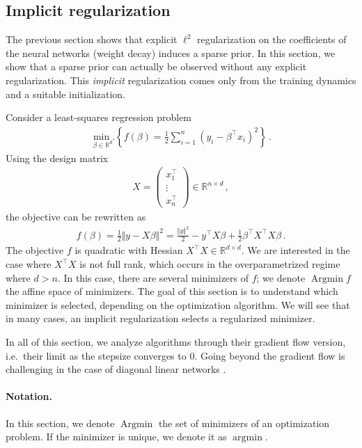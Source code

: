 \documentclass[11pt,reqno]{article}
\DeclareMathOperator*{\argmin}{argmin}
\DeclareMathOperator*{\Argmin}{Argmin}
\newcommand{\R}{\mathbb{R}}
\numberwithin{equation}{section}
\theoremstyle{plain}
\theoremstyle{definition}
\theoremstyle{remark}
\begin{document}
\subsection{Implicit regularization}

The previous section shows that explicit $\ell^2$ regularization on the coefficients of the neural networks (weight decay) induces a sparse prior. In this section, we show that a sparse prior can actually be observed without any explicit regularization. This \emph{implicit} regularization comes only from the training dynamics and a suitable initialization. 

Consider a least-squares regression problem 
\begin{align*}
	\underset{\beta \in \R^d}{\min.} \left\{ f(\beta) = \frac{1}{2} \sum_{i=1}^{n} \left(y_i - \beta^\top x_i\right)^2 \right\} \, .
\end{align*}
Using the design matrix 
\begin{align*}
	X = \begin{pmatrix}
		x_1^\top \\ \hline 
		\vdots \\ \hline
		x_n^\top
	\end{pmatrix} \in \R^{n \times d} \, ,
\end{align*}
the objective can be rewritten as
\begin{align*}
	f(\beta) = \frac{1}{2} \Vert y - X\beta \Vert^2 = \frac{\Vert y \Vert^2}{2} - y^\top X \beta + \frac{1}{2} \beta^\top X^\top X \beta \, .
\end{align*}
The objective $f$ is quadratic with Hessian $X^\top X \in \R^{d\times d}$. We are interested in the case where $X^\top X$ is not full rank, which occurs in the overparametrized regime where $d > n$. In this case, there are several minimizers of $f$; we denote $\Argmin f$ the affine space of minimizers. The goal of this section is to understand which minimizer is selected, depending on the optimization algorithm. We will see that in many cases, an implicit regularization selects a regularized minimizer. 

In all of this section, we analyze algorithms through their gradient flow version, i.e.~their limit as the stepsize converges to $0$. Going beyond the gradient flow is challenging in the case of diagonal linear networks \cite{even2023s}. 

\paragraph{Notation.} In this section, we denote $\Argmin$ the set of minimizers of an optimization problem. If the minimizer is unique, we denote it as $\argmin$.
\end{document}
